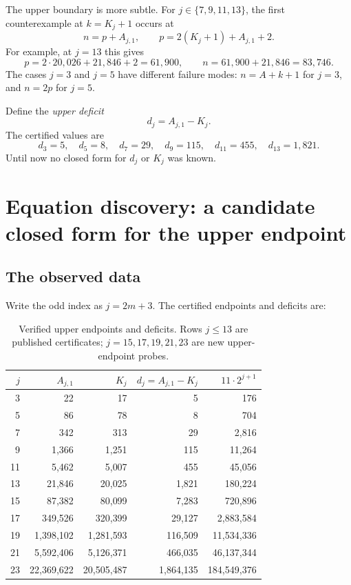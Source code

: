 \documentclass[11pt]{article}
\theoremstyle{remark}
\begin{document}
The upper boundary is more subtle. For \(j\in\{7,9,11,13\}\), the first counterexample at \(k=K_j+1\) occurs at
\begin{equation}\label{eq:upperfail}
n=p+A_{j,1},
\qquad
p=2(K_j+1)+A_{j,1}+2.
\end{equation}
For example, at \(j=13\) this gives
\[
p=2\cdot20{,}026+21{,}846+2=61{,}900,
\qquad
n=61{,}900+21{,}846=83{,}746.
\]
The cases \(j=3\) and \(j=5\) have different failure modes: \(n=A+k+1\) for \(j=3\), and \(n=2p\) for \(j=5\).

Define the \emph{upper deficit}
\begin{equation}\label{eq:deficit}
d_j=A_{j,1}-K_j.
\end{equation}
The certified values are
\begin{equation}\label{eq:dvalues}
d_3=5,\quad d_5=8,\quad d_7=29,\quad d_9=115,\quad d_{11}=455,\quad d_{13}=1{,}821.
\end{equation}
Until now no closed form for \(d_j\) or \(K_j\) was known.

\section{Equation discovery: a candidate closed form for the upper endpoint}\label{sec:endpoint-law}

\subsection{The observed data}

Write the odd index as \(j=2m+3\). The certified endpoints and deficits are:

\begin{table}[h]
\centering
\small
\caption{Verified upper endpoints and deficits. Rows \(j\le13\) are published certificates; \(j=15,17,19,21,23\) are new upper-endpoint probes.}
\label{tab:deficits}
\begin{tabular}{rrrrr}
\toprule
\(j\) & \(A_{j,1}\) & \(K_j\) & \(d_j=A_{j,1}-K_j\) & \(11\cdot2^{j+1}\)\\
\midrule
3 & 22 & 17 & 5 & 176\\
5 & 86 & 78 & 8 & 704\\
7 & 342 & 313 & 29 & 2{,}816\\
9 & 1{,}366 & 1{,}251 & 115 & 11{,}264\\
11 & 5{,}462 & 5{,}007 & 455 & 45{,}056\\
13 & 21{,}846 & 20{,}025 & 1{,}821 & 180{,}224\\
15 & 87{,}382 & 80{,}099 & 7{,}283 & 720{,}896\\
17 & 349{,}526 & 320{,}399 & 29{,}127 & 2{,}883{,}584\\
19 & 1{,}398{,}102 & 1{,}281{,}593 & 116{,}509 & 11{,}534{,}336\\
21 & 5{,}592{,}406 & 5{,}126{,}371 & 466{,}035 & 46{,}137{,}344\\
23 & 22{,}369{,}622 & 20{,}505{,}487 & 1{,}864{,}135 & 184{,}549{,}376\\
\bottomrule
\end{tabular}
\end{table}
\end{document}
